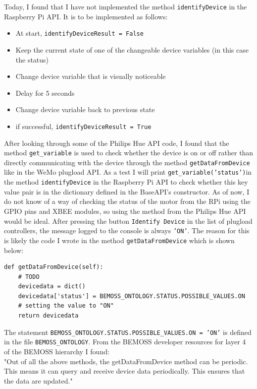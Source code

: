 \documentclass[fontsize=11pt, %
                             paper=letter, %
                             twoside, %
                             captions=tableheading,
                             index=totoc,
                             hyperref]{labbook}
\begin{document}
\begin{addmargin}[0cm]{0cm}
Today, I found that I have not implemented the method \texttt{identifyDevice} in the Raspberry Pi API. It is to be implemented as follows:
\begin{itemize}
\item At start, \texttt{identifyDeviceResult = False}
\item Keep the current state of one of the changeable device variables (in this case the status)
\item Change device variable that is visually noticeable
\item Delay for 5 seconds
\item Change device variable back to previous state
\item if successful, \texttt{identifyDeviceResult = True}
\end{itemize}
After looking through some of the Philips Hue API code, I found that the method \texttt{get\_variable} is used to check whether the device is on or off rather than directly communicating with the device through the method \texttt{getDataFromDevice} like in the WeMo plugload API. As a test I will print \texttt{get\_variable('status')}in the method \texttt{identifyDevice} in the Raspberry Pi API to check whether this key value pair is in the dictionary defined in the BaseAPI's constructor. As of now, I do not know of a way of checking the status of the motor from the RPi using the GPIO pins and XBEE modules, so using the method from the Philips Hue API would be ideal.
\bigbreak\noindent
After pressing the button \texttt{Identify Device} in the list of plugload controllers, the message logged to the console is always \texttt{'ON'}. The reason for this is likely the code I wrote in the method \texttt{getDataFromDevice} which is shown below:
\begin{Verbatim}[tabsize=4]
def getDataFromDevice(self):
	# TODO 
	devicedata = dict()
	devicedata['status'] = BEMOSS_ONTOLOGY.STATUS.POSSIBLE_VALUES.ON 
	# setting the value to "ON"
	return devicedata
\end{Verbatim}
The statement \texttt{BEMOSS\_ONTOLOGY.STATUS.POSSIBLE\_VALUES.ON = 'ON'} is defined in the file \texttt{BEMOSS\_ONTOLOGY}. From the BEMOSS developer resources for layer 4 of the BEMOSS hierarchy I found:\\

"Out of all the above methods, the getDataFromDevice method can be periodic. This means
it can query and receive device data periodically. This ensures that the data are updated."\\


\end{addmargin}
\end{document}
